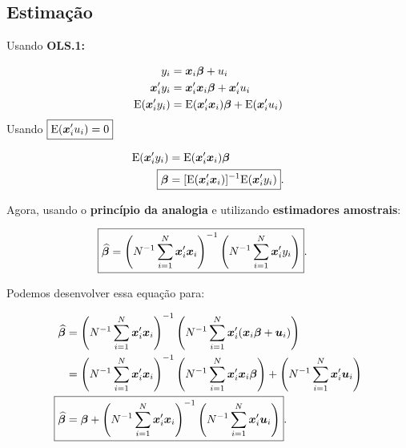 \documentclass[11pt, oneside, a4paper, article]{article}
\numberwithin{equation}{section}
\begin{document}
\subsection{Estimação} 

Usando \textbf{OLS.1:}

\vspace{-1.5 em}
\begin{align*}
	y_{i} &= \boldsymbol{x}_{i} \boldsymbol{\beta} + u_{i} 
	\\
	\boldsymbol{x}_{i}' y_{i} &= \boldsymbol{x}_{i}' \boldsymbol{x}_{i} \boldsymbol{\beta} + \boldsymbol{x}_{i}' u_{i} 
	\\
	\text{E}( \boldsymbol{x}_{i}' y_{i}) &= \text{E}( \boldsymbol{x}_{i}' \boldsymbol{x}_{i} ) \boldsymbol{\beta} + \text{E}( \boldsymbol{x}_{i}' u_{i} ) 
\end{align*}
Usando $\boxed{\text{E}( \boldsymbol{x}_{i}' u_{i} ) = 0}$ 

\vspace{-1 em}
\begin{align}
	\notag
	\E( \xvec_{i}' y_{i}) &= \E( \xvec_{i}' \xvec_{i} ) \betavec
	\\
	\label{ols:beta}
	\Aboxed{\betavec &= [\E( \xvec_{i}' \xvec_{i} )]^{-1} \E( \xvec_{i}' y_{i}) }.
\end{align}

Agora, usando o \textbf{princípio da analogia} e utilizando \textbf{estimadores amostrais}:

\vspace{-1 em}
\begin{align}\label{ols:betahat:sums}
	\Aboxed{
		\betahatbold &= 
		\left( N^{-1} \sum_{i=1}^{N} \xvec_{i}' \xvec_{i} \right)^{-1}
	\left( N^{-1} \sum_{i=1}^{N} \xvec_{i}' y_{i} \right) }.
\end{align}

Podemos desenvolver essa equação para:

\vspace{-1 em}
\begin{align}
	\notag
	\betahatbold &= 
	\left( N^{-1} \sum_{i=1}^{N} \xvec_{i}' \xvec_{i} \right)^{-1}
	\left( N^{-1} \sum_{i=1}^{N} \xvec_{i}' (\xvec_{i} \betavec + \uvec_{i}) \right)
	\\
	\notag
	&=
	\left( N^{-1} \sum_{i=1}^{N} \xvec_{i}' \xvec_{i} \right)^{-1}
	\left( N^{-1} \sum_{i=1}^{N} \xvec_{i}' \xvec_{i} \betavec \right) +
	\left( N^{-1} \sum_{i=1}^{N} \xvec_{i}' \uvec_{i} \right)
	\\
	\label{ols:betahat:u}
	\Aboxed{
		\betahatbold &= 
		\betavec +
		\left( N^{-1} \sum_{i=1}^{N} \xvec_{i}' \xvec_{i} \right)^{-1}
	\left( N^{-1} \sum_{i=1}^{N} \xvec_{i}' \uvec_{i} \right) }.
\end{align}
\end{document}
